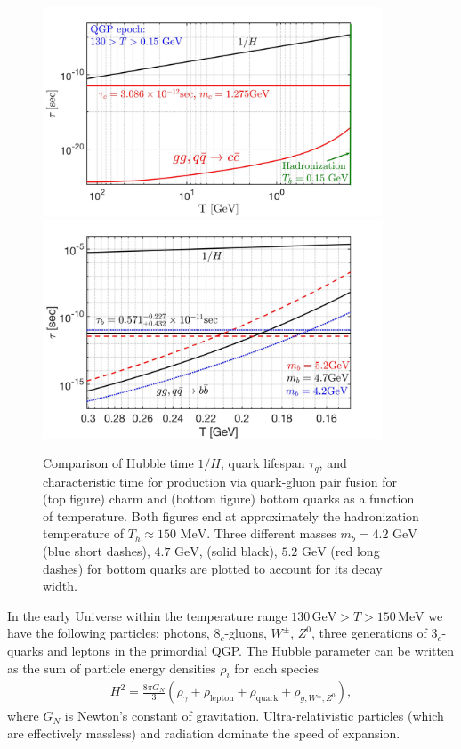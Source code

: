 \documentclass[universe,article,submit,moreauthors,pdftex,a4paper]{Definitions/mdpi}
\newcommand{\GeV}{\text{ GeV}}
\newcommand{\MeV}{\text{ MeV}}
\begin{document}
\begin{figure} %
    \centering
    \includegraphics[width=0.9\textwidth]{./plots/CharmQuark_QGP.jpg}
    \includegraphics[width=0.9\textwidth]{./plots/BQuarkReactionTime_bottom.jpg}
    \caption{Comparison of Hubble time $1/H$, quark lifespan $\tau_{q}$, and characteristic time for production via quark-gluon pair fusion for (top figure) charm and (bottom figure) bottom quarks as a function of temperature. Both figures end at approximately the hadronization temperature of $T_{h}\approx150\MeV$. Three different masses $m_{b}=4.2\GeV$ (blue short dashes), $4.7\GeV$, (solid black), $5.2\GeV$ (red long dashes) for bottom quarks are plotted to account for its decay width.}
\label{BCreaction_fig}
\end{figure}

In the early Universe within the temperature range $130\, \mathrm{GeV}>T>150\, \mathrm{MeV}$ we have the following particles: photons, $8_c$-gluons, $W^\pm$, $Z^0$, three generations of $3_c$-quarks and leptons in the primordial QGP. The Hubble parameter can be written as the sum of particle energy densities $\rho_i$ for each species
\begin{align}
H^2=\frac{8\pi G_{N}}{3}\left(\rho_\gamma+\rho_{\mathrm{lepton}}+\rho_{\mathrm{quark}}+\rho_{g,{W^\pm},{Z^0}}\right),
\end{align}
where $G_{N}$ is Newton's constant of gravitation. Ultra-relativistic particles (which are effectively massless) and radiation dominate the speed of expansion.
\end{document}
